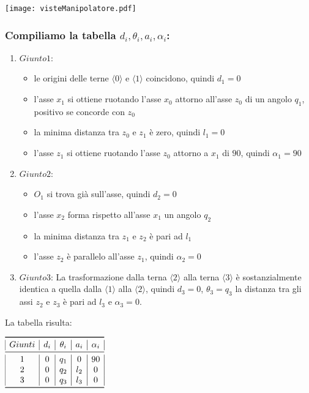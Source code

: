 \texttt{[image: visteManipolatore.pdf]}

\subsubsection{Compiliamo la tabella $d_i, \theta_i, a_i, \alpha_i$:}
\begin{enumerate}
	\item $Giunto 1$:
	\begin{itemize}
		\item le origini delle terne $\langle0\rangle$ e $\langle1\rangle$ coincidono, quindi $d_1 = 0$
		\item l'asse $x_1$ si ottiene ruotando l'asse $x_0$ attorno all'asse $z_0$ di un angolo $q_1$, positivo se concorde con $z_0$
		\item la minima distanza tra $z_0$ e $z_1$ è zero, quindi $l_1 = 0$
		\item l'asse $z_1$ si ottiene ruotando l'asse $z_0$ attorno a $x_1$ di $90$, quindi $\alpha_1 = 90$
	\end{itemize}
	\item $Giunto 2$:
	\begin{itemize}
		\item $O_1$ si trova già sull'asse, quindi $d_2 = 0$
		\item l'asse $x_2$ forma rispetto all'asse $x_1$ un angolo $q_2$
		\item la minima distanza tra $z_1$ e $z_2$ è pari ad $l_1$
		\item l'asse $z_2$ è parallelo all'asse $z_1$, quindi $\alpha_2 = 0$
	\end{itemize}
	\item $Giunto 3$:
	La trasformazione dalla terna $\langle2\rangle$ alla terna $\langle3\rangle$ è sostanzialmente identica a quella dalla $\langle1\rangle$ alla $\langle2\rangle$, quindi $d_3 = 0$, $\theta_3 = q_3$ la distanza tra gli assi $z_2$ e $z_3$ è pari ad $l_3$ e $\alpha_3 = 0$.
\end{enumerate}
La tabella risulta:
\begin{center}
$
\begin{array}{|c|c|c|c|c|}
\toprule
Giunti & d_i & \theta_i & a_i & \alpha_i \\
\midrule
1 & 0 & q_1 & 0 & 90 \\
2 & 0 & q_2 & l_2 & 0 \\
3 & 0 & q_3 & l_3 & 0 \\
\bottomrule
\end{array}
$
\end{center}


